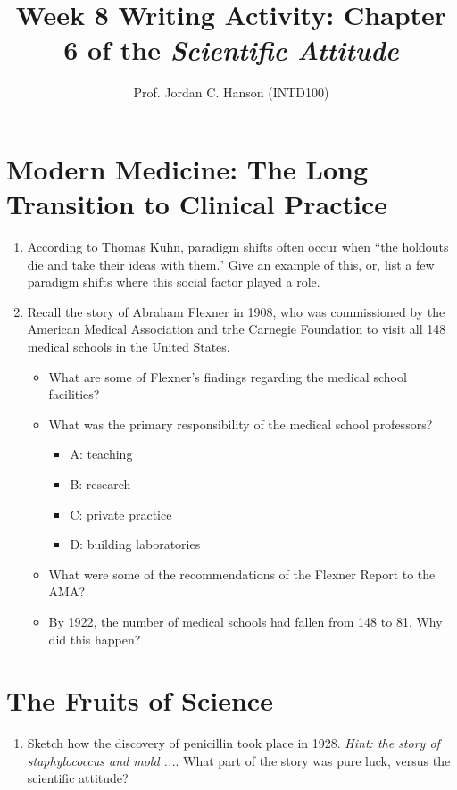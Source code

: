 \documentclass{article}
\begin{document}
\title{Week 8 Writing Activity: Chapter 6 of the \textit{Scientific Attitude}}
\author{Prof. Jordan C. Hanson (INTD100)}

\maketitle

\section{Modern Medicine: The Long Transition to Clinical Practice}

\begin{enumerate}
\item According to Thomas Kuhn, paradigm shifts often occur when ``the holdouts die and take their ideas with them.''  Give an example of this, or, list a few paradigm shifts where this social factor played a role. \\ \vspace{2cm}
\item Recall the story of Abraham Flexner in 1908, who was commissioned by the American Medical Association and trhe Carnegie Foundation to visit all 148 medical schools in the United States.
\begin{itemize}
\item What are some of Flexner's findings regarding the medical school facilities? \\ \vspace{1cm}
\item What was the primary responsibility of the medical school professors?
\begin{itemize}
\item A: teaching
\item B: research
\item C: private practice
\item D: building laboratories
\end{itemize}
\item What were some of the recommendations of the Flexner Report to the AMA? \\ \vspace{2cm}
\item By 1922, the number of medical schools had fallen from 148 to 81.  Why did this happen? \\ \vspace{1cm}
\end{itemize}
\end{enumerate}

\section{The Fruits of Science}

\begin{enumerate}
\item Sketch how the discovery of penicillin took place in 1928.  \textit{Hint: the story of staphylococcus and mold ...}.  What part of the story was pure luck, versus the scientific attitude?
\end{enumerate}
\end{document}
